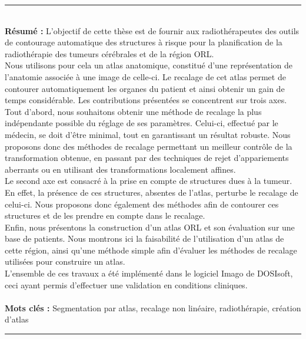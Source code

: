 \documentclass[a4paper,11pt,twoside]{StyleThese}
\begin{document}
\cleardoublepage
\begin{vcenterpage}
\noindent\rule[2pt]{\textwidth}{0.5pt}
\\
{\large\textbf{Résumé :}}
L'objectif de cette thèse est de fournir aux radiothérapeutes des outils de contourage automatique des structures à risque pour la planification de la radiothérapie des tumeurs cérébrales et de la région ORL.
\\
Nous utilisons pour cela un atlas anatomique, constitué d'une représentation de l'anatomie associée à une image de celle-ci. Le recalage de cet atlas permet de contourer automatiquement les organes du patient et ainsi obtenir un gain de temps considérable. Les contributions présentées se concentrent sur trois axes.
\\
Tout d'abord, nous souhaitons obtenir une méthode de recalage la plus indépendante possible du réglage de ses paramètres. Celui-ci, effectué par le médecin, se doit d'être minimal, tout en garantissant un résultat robuste. Nous proposons donc des méthodes de recalage permettant un meilleur contrôle de la transformation obtenue, en passant par des techniques de rejet d'appariements aberrants ou en utilisant des transformations localement affines.
\\
Le second axe est consacré à la prise en compte de structures dues à la tumeur. En effet, la présence de ces structures, absentes de l'atlas, perturbe le recalage de celui-ci. Nous proposons donc également des méthodes afin de contourer ces structures et de les prendre en compte dans le recalage.
\\
Enfin, nous présentons la construction d'un atlas ORL et son évaluation sur une base de patients. Nous montrons ici la faisabilité de l'utilisation d'un atlas de cette région, ainsi qu'une méthode simple afin d'évaluer les méthodes de recalage utilisées pour construire un atlas.
\\
L'ensemble de ces travaux a été implémenté dans le logiciel Imago de DOSIsoft, ceci ayant permis d'effectuer une validation en conditions cliniques.
\\
\\
{\large\textbf{Mots clés :}}
Segmentation par atlas, recalage non linéaire, radiothérapie, création d'atlas
\\
\noindent\rule[2pt]{\textwidth}{0.5pt}
\end{vcenterpage}
\end{document}
